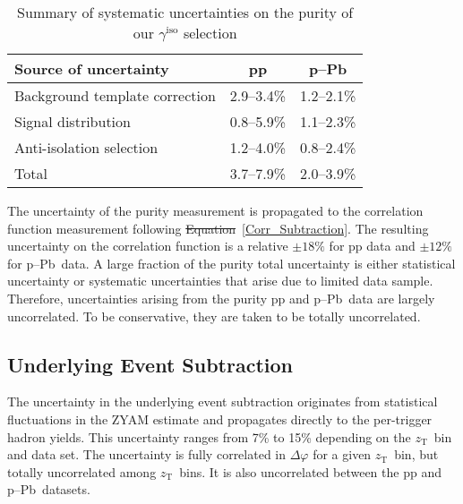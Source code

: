 \documentclass[ALICE,manyauthors]{cernphprep}
\newcommand{\zt}{\ensuremath{z_{\mathrm{T}}}\xspace}
\newcommand{\gammaiso}{\ensuremath{\gamma^\mathrm{iso}}}
\newcommand{\pPb}          {\mbox{p--Pb}\xspace}
\providecommand{\DIFaddtex}[1]{{\protect\color{blue}\uwave{#1}}} %
\providecommand{\DIFdeltex}[1]{{\protect\color{red}\sout{#1}}}                      %
\providecommand{\DIFaddbegin}{} %
\providecommand{\DIFaddend}{} %
\providecommand{\DIFdelbegin}{} %
\providecommand{\DIFdelend}{} %
\providecommand{\DIFaddFL}[1]{\DIFadd{#1}} %
\providecommand{\DIFaddbeginFL}{} %
\providecommand{\DIFaddendFL}{} %
\providecommand{\DIFdelbeginFL}{} %
\providecommand{\DIFdelendFL}{} %
\providecommand{\DIFadd}[1]{\texorpdfstring{\DIFaddtex{#1}}{#1}} %
\providecommand{\DIFdel}[1]{\texorpdfstring{\DIFdeltex{#1}}{}} %
\newcommand{\DIFscaledelfig}{0.5}
\newlength{\DIFdelgraphicswidth} %
\newlength{\DIFdelgraphicsheight} %
\newcommand{\DIFaddincludegraphics}[2][]{{\color{blue}\fbox{\DIFOincludegraphics[#1]{#2}}}} %
\newcommand{\DIFdelincludegraphics}[2][]{%
\sbox{\DIFdelgraphicsbox}{\DIFOincludegraphics[#1]{#2}}%
\settoboxwidth{\DIFdelgraphicswidth}{\DIFdelgraphicsbox} %
\settoboxtotalheight{\DIFdelgraphicsheight}{\DIFdelgraphicsbox} %
\scalebox{\DIFscaledelfig}{%
\parbox[b]{\DIFdelgraphicswidth}{\usebox{\DIFdelgraphicsbox}\\[-\baselineskip] \rule{\DIFdelgraphicswidth}{0em}}\llap{\resizebox{\DIFdelgraphicswidth}{\DIFdelgraphicsheight}{%
\setlength{\unitlength}{\DIFdelgraphicswidth}%
\begin{picture}(1,1)%
\thicklines\linethickness{2pt} %
{\color[rgb]{1,0,0}\put(0,0){\framebox(1,1){}}}%
{\color[rgb]{1,0,0}\put(0,0){\line( 1,1){1}}}%
{\color[rgb]{1,0,0}\put(0,1){\line(1,-1){1}}}%
\end{picture}%
}\hspace*{3pt}}} %
} %
\DeclareRobustCommand{\DIFaddbegin}{\DIFOaddbegin \let\includegraphics\DIFaddincludegraphics} %
\DeclareRobustCommand{\DIFaddend}{\DIFOaddend \let\includegraphics\DIFOincludegraphics} %
\DeclareRobustCommand{\DIFdelbegin}{\DIFOdelbegin \let\includegraphics\DIFdelincludegraphics} %
\DeclareRobustCommand{\DIFdelend}{\DIFOaddend \let\includegraphics\DIFOincludegraphics} %
\DeclareRobustCommand{\DIFaddbeginFL}{\DIFOaddbeginFL \let\includegraphics\DIFaddincludegraphics} %
\DeclareRobustCommand{\DIFaddendFL}{\DIFOaddendFL \let\includegraphics\DIFOincludegraphics} %
\DeclareRobustCommand{\DIFdelbeginFL}{\DIFOdelbeginFL \let\includegraphics\DIFdelincludegraphics} %
\DeclareRobustCommand{\DIFdelendFL}{\DIFOaddendFL \let\includegraphics\DIFOincludegraphics} %
\begin{document}
\begin{table}
\caption{Summary of systematic uncertainties \DIFaddbeginFL \DIFaddFL{(absolute quantities) }\DIFaddendFL on the purity of our $\gammaiso$ selection\DIFdelbeginFL %
\DIFdelendFL }
   \begin{tabular*}{1.0\columnwidth}{@{\extracolsep{\fill}}lcc@{}}
    \hline
    Source of uncertainty    & pp  & \pPb\\
        \hline
        Background template correction & 2.9--3.4\% & 1.2--2.1\% \\
        Signal distribution & 0.8--5.9\% & 1.1--2.3\% \\
        Anti-isolation selection &  1.2--4.0\% & 0.8--2.4\% \\
        \hline
        Total &  3.7--7.9\% & 2.0--3.9\%
    \end{tabular*}
    \label{tab:pursyst}
\end{table}
The uncertainty of the purity measurement is propagated to the correlation function measurement following \DIFdelbegin \DIFdel{Equation}\DIFdelend \DIFaddbegin \DIFadd{Eq.}\DIFaddend ~\ref{Corr_Subtraction}. The resulting uncertainty on the correlation function is a relative $\pm18\%$ for pp data and  $\pm12\%$ for \pPb~data. A large fraction of the purity total uncertainty is either statistical uncertainty or systematic uncertainties that arise due to limited data sample. Therefore, uncertainties arising from the purity  pp and \pPb~data are largely uncorrelated. To be conservative, they are taken to be totally uncorrelated.

\subsection{Underlying Event Subtraction}
The uncertainty in the underlying event subtraction originates from statistical fluctuations in the ZYAM estimate and propagates directly to the per-trigger hadron yields. This uncertainty ranges from 7\% to 15\% depending on the \zt~bin and data set. The uncertainty is fully correlated in $\Delta\varphi$ for a given \zt~bin, but totally uncorrelated among \zt~bins. It is also uncorrelated between the pp and \pPb~datasets.
\end{document}
